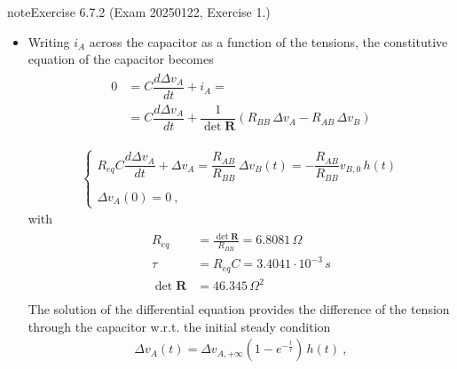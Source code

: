 \documentclass[letterpaper,10pt,english]{jupyterBook}
\begin{document}
\begin{sphinxadmonition}{note}{Exercise 6.7.2 (Exam 2025\sphinxhyphen{}01\sphinxhyphen{}22, Exercise 1.)}
\begin{itemize}
\begin{equation*}
\end{equation*}
\item {} 
\sphinxAtStartPar
{} Writing \(i_A\) across the capacitor as a function of the tensions, the constitutive equation of the capacitor becomes
\begin{equation*}
\begin{split}\begin{aligned}
  0 & = C \dfrac{d \Delta v_A}{d t} + i_A = \\
    & = C \dfrac{d \Delta v_A}{d t} + \dfrac{1}{\det \mathbf{R}} \left( R_{BB} \, \Delta v_A - R_{AB} \, \Delta v_B \right)  \\ \\
   \end{aligned}\end{split}
\end{equation*}\begin{equation*}
\begin{split}\begin{cases}
      R_{eq} C \dfrac{d \Delta v_A}{d t} + \Delta v_A = \dfrac{ R_{AB} }{ R_{BB} } \, \Delta v_B(t) = - \dfrac{ R_{AB} }{ R_{BB} } v_{B,0} \, h(t)  \\ \\
      \Delta v_A(0) = 0 \ ,
   \end{cases}\end{split}
\end{equation*}
\sphinxAtStartPar
with
\begin{equation*}
\begin{split}\begin{aligned}
     R_{eq} & = \frac{\det \mathbf{R}}{R_{BB}} = 6.8081 \, \Omega \\
     \tau & = R_{eq} C = 3.4041 \cdot 10^{-3} \, s \\
     \det \mathbf{R} & = 46.345 \, \Omega^2 \\
   \end{aligned}\end{split}
\end{equation*}
\sphinxAtStartPar
The solution of the differential equation provides the difference of the tension through the capacitor w.r.t. the initial steady condition
\begin{equation*}
\begin{split}\Delta v_A(t) = \Delta v_{A,+\infty} \left( 1 - e^{-\frac{t}{\tau}} \right) \, h(t) \ ,\end{split}
\end{equation*}

\end{itemize}
\end{sphinxadmonition}
\end{document}
